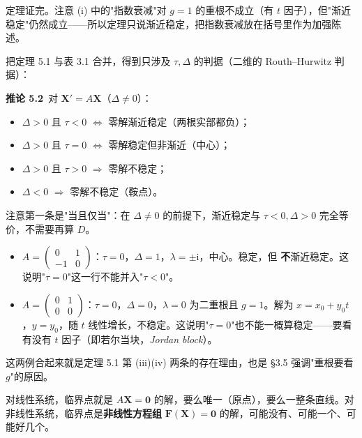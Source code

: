 \documentclass[11pt]{ctexart}
\newcommand{\X}{\mathbf{X}}\newcommand{\Y}{\mathbf{Y}}
\newcommand{\F}{\mathbf{F}}
\newcommand{\EN}[1]{\textcolor{inkgray}{\itshape #1}}
\begin{document}
定理证完。注意 (i) 中的"指数衰减"对 $g=1$ 的重根不成立（有 $t$ 因子），但"渐近稳定"仍然成立——所以定理只说渐近稳定，把指数衰减放在括号里作为加强陈述。


把定理 5.1 与表 3.1 合并，得到只涉及 $\tau,\Delta$ 的判据（二维的 Routh–Hurwitz 判据）：

\textbf{推论 5.2}\ 对 $\X'=A\X$（$\Delta\neq0$）：
\begin{itemize}
\item $\Delta>0$ 且 $\tau<0$ $\iff$ 零解渐近稳定（两根实部都负）；
\item $\Delta>0$ 且 $\tau=0$ $\iff$ 零解稳定但非渐近（中心）；
\item $\Delta>0$ 且 $\tau>0$ $\Longrightarrow$ 零解不稳定；
\item $\Delta<0$ $\Longrightarrow$ 零解不稳定（鞍点）。
\end{itemize}
注意第一条是"当且仅当"：在 $\Delta\neq0$ 的前提下，渐近稳定与 $\tau<0,\Delta>0$ 完全等价，不需要再算 $D$。


\begin{itemize}
\item $A=\begin{pmatrix}0&1\\-1&0\end{pmatrix}$：$\tau=0$，$\Delta=1$，$\lambda=\pm\mathrm{i}$，中心。稳定，但 \textbf{不}渐近稳定。这说明"$\tau=0$"这一行不能并入"$\tau<0$"。
\item $A=\begin{pmatrix}0&1\\0&0\end{pmatrix}$：$\tau=0$，$\Delta=0$，$\lambda=0$ 为二重根且 $g=1$。解为 $x=x_0+y_0t$，$y=y_0$，随 $t$ 线性增长，不稳定。这说明"$\tau=0$"也不能一概算稳定——要看有没有 $t$ 因子（即若尔当块，\EN{Jordan block}）。
\end{itemize}

这两例合起来就是定理 5.1 第 (iii)(iv) 两条的存在理由，也是 §3.5 强调"重根要看 $g$"的原因。



对线性系统，临界点就是 $A\X=\mathbf{0}$ 的解，要么唯一（原点），要么一整条直线。对非线性系统，临界点是\textbf{非线性方程组} $\F(\X)=\mathbf{0}$ 的解，可能没有、可能一个、可能好几个。
\end{document}
